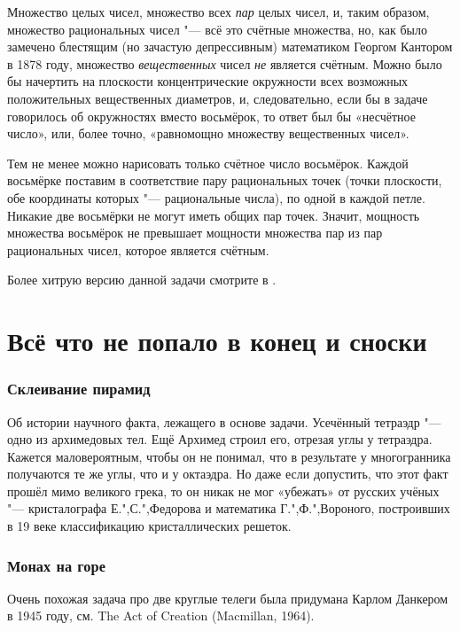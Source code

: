 \documentclass[twoside]{book}
\begin{document}
\medskip

Множество целых чисел, множество всех \emph{пар} целых чисел, и, таким образом, множество рациональных чисел "--- всё это счётные множества, но, как было замечено блестящим (но зачастую депрессивным) математиком Георгом Кантором в 1878 году, множество \emph{вещественных} чисел \emph{не} является счётным.
Можно было бы начертить на плоскости концентрические окружности всех возможных положительных вещественных диаметров, и, следовательно, если бы в задаче говорилось об окружностях вместо восьмёрок, то ответ был бы «несчётное число», или, более точно, «равномощно множеству вещественных чисел».

Тем не менее можно нарисовать только счётное число восьмёрок.
Каждой восьмёрке поставим в соответствие пару рациональных точек (точки плоскости, обе координаты которых "--- рациональные числа), по одной в каждой петле.
Никакие две восьмёрки не могут иметь общих пар точек.
Значит, мощность множества восьмёрок не превышает мощности множества пар из пар рациональных чисел, которое является счётным.\heart

Более хитрую версию данной задачи смотрите в .

\section*{Всё что не попало в конец и сноски}

\subsubsection*{Склеивание пирамид}
Об истории научного факта, лежащего в основе задачи. 
Усечённый тетраэдр "--- одно из архимедовых тел. Ещё Архимед строил его, отрезая углы у тетраэдра. 
Кажется маловероятным, чтобы он не понимал, что в результате у многогранника получаются те же углы, что и у октаэдра.
Но даже если допустить, что этот факт прошёл мимо великого грека, то он никак не мог «убежать» от русских учёных "--- 
кристалографа Е.",С.",Федорова и математика Г.",Ф.",Вороного, построивших в 19 веке классификацию кристаллических решеток.

\subsubsection{Монах на горе}
Очень похожая задача про две круглые телеги была придумана Карлом Данкером в 1945 году, см. 
The Act of Creation (Macmillan, 1964). 
\end{document}
